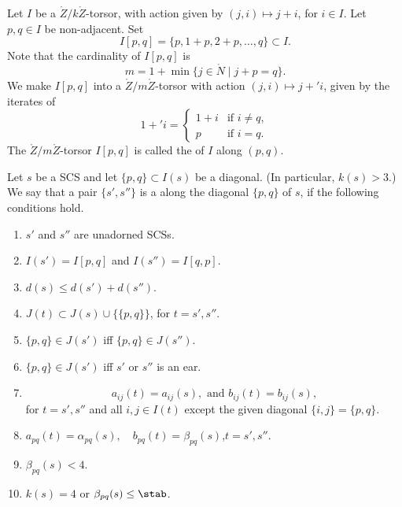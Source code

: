 \begin{definition} 
Let $I$ be a $\ring{Z}/k\ring{Z}$-torsor, with action given by $(j,i)\mapsto j+i$,
for $i\in I$.  Let $p,q\in I$ be non-adjacent.  Set
\[
I[p,q] = \{p,1+p,2+p,\ldots,q\} \subset I.
\]
Note that the cardinality of $I[p,q]$ is
\[
m = 1 + \min \{j\in \ring{N} \mid j + p = q\}.
\]
We make $I[p,q]$ into a $\ring{Z}/m\ring{Z}$-torsor with action $(j,i)\mapsto j+' i$,
given by the iterates of
\[
1 +' i = 
\begin{cases}
  1 + i &\text{if } i\ne q,\\
  p &\text{if } i = q.
\end{cases}
\]
The $\ring{Z}/m\ring{Z}$-torsor $I[p,q]$ is called the
 of $I$ along $(p,q)$.
%
\end{definition}

\figWKUYEXM %


\begin{definition}
 Let $s$ be a SCS and let $\{p,q\}\subset I(s)$ be a diagonal.
  (In particular, $k(s)>3$.)  We
  say that a pair $\{s',s''\}$ is a
 along  the
  diagonal $\{p,q\}$ of $s$, if the following conditions hold.
\begin{enumerate}
\item $s'$ and $s''$ are unadorned SCSs.
\item $I(s')=I[p,q]$ and $I(s'') = I[q,p]$.
\item $d(s) \le d(s') + d(s'')$.
\item $J(t) \subset J(s) \cup \{\{p,q\}\}$, for $t = s',s''$.  
\item $\{p,q\}\in J(s')$ iff $\{p,q\}\in J(s'')$.
\item $\{p,q\}\in J(s')$ iff $s'$ or $s''$ is an ear.
\item 
\[
a_{ij}(t) = a_{ij}(s), \text{ and } b_{ij}(t) = b_{ij}(s),
\]
for  $t=s',s''$ and all $i,j\in I(t)$ except the given diagonal $\{i,j\} = \{p,q\}$.
\item $a_{pq}(t) = \alpha_{pq}(s),\quad b_{pq}(t)=\beta_{pq}(s)$,\quad $t = s',s''$.
\item $\beta_{pq}(s) < 4$.
\item $k(s)=4$ or $\beta_{pq}(s) \le \stab$.
\end{enumerate}
\end{definition}


